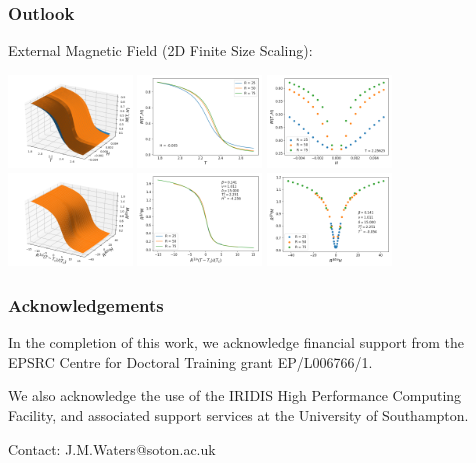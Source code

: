 \documentclass{beamer}
\begin{document}
\begin{frame}
	\frametitle{Outlook}
	External Magnetic Field (2D Finite Size Scaling):

	\includegraphics[width=3.3cm]{Images/2dFSS/3dunscaled} \hspace{1mm}
	\includegraphics[width=3.3cm]{Images/2dFSS/magtemp} \hspace{1mm}
	\includegraphics[width=3.3cm]{Images/2dFSS/magfield} \\ \vspace{1mm}
	\includegraphics[width=3.3cm]{Images/2dFSS/3dscaled} \hspace{1mm}
	\includegraphics[width=3.3cm]{Images/2dFSS/scaledmagtemp} \hspace{1mm}
	\includegraphics[width=3.3cm]{Images/2dFSS/scaledmagfield}
\end{frame}

\begin{frame}
	\frametitle{Acknowledgements}
	In the completion of this work, we acknowledge financial support from the EPSRC Centre for Doctoral Training grant EP/L006766/1. \newline

	We also acknowledge the use of the IRIDIS High Performance Computing Facility, and associated support services at the University of
Southampton. \newline

	Contact: J.M.Waters@soton.ac.uk
\end{frame}
\end{document}
